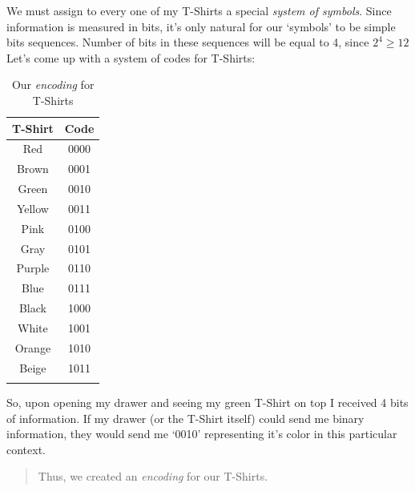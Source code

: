 \documentclass{article}
\begin{document}
            We must assign to every one of my T-Shirts a special \emph{system of symbols}. Since information is measured in bits, it's only natural for our `symbols' to 
            be simple bits sequences. Number of bits in these sequences will be equal to 4, since $2^4 \geq 12$\\
            Let's come up with a system of codes for T-Shirts:

            \begin{table}[h]
                \centering
                \begin{longtable}{cc}
                    \toprule
                    T-Shirt & Code \\
                    \toprule
                    Red & 0000 \\
                    Brown & 0001 \\
                    Green & 0010 \\
                    Yellow & 0011 \\
                    Pink & 0100 \\
                    Gray & 0101 \\
                    Purple & 0110 \\
                    Blue & 0111 \\
                    Black & 1000 \\
                    White & 1001 \\
                    Orange & 1010 \\
                    Beige & 1011 \\
                    \bottomrule
                    \caption{Our \emph{encoding} for T-Shirts}
                \end{longtable}
            \end{table}
            So, upon opening my drawer and seeing my green T-Shirt on top I received 4 bits of information. If my drawer (or the T-Shirt itself) could send me binary
            information, they would send me `0010' representing it's color in this particular context.\par

            \begin{quote}
                Thus, we created an \emph{encoding} for our T-Shirts.
            \end{quote}

            \newpage
\end{document}
